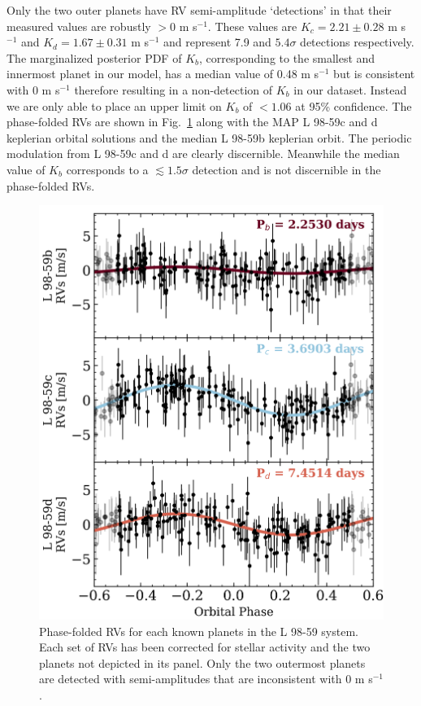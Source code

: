 \documentclass[longauth]{aa}
\newcommand{\mps}{m s$^{-1}$}
\begin{document}
Only the two outer planets have RV semi-amplitude `detections' in that their measured values are robustly $>0$ \mps{.} These values are $K_c=2.21\pm 0.28$ \mps{} and $K_d=1.67\pm 0.31$ \mps{} and represent 7.9 and $5.4\sigma$ detections respectively. The marginalized posterior PDF of $K_b$, corresponding to the smallest and innermost planet in our model, has a median value of 0.48 \mps{} but is consistent with 0 \mps{} therefore resulting in a non-detection of $K_b$ in our dataset. Instead we are only able to place an upper limit on $K_b$ of $<1.06$ at 95\% confidence. The phase-folded RVs are shown in Fig.~\ref{fig:rvphased} along with the MAP L 98-59c and d keplerian orbital solutions and the median L 98-59b keplerian orbit. The periodic modulation from L 98-59c and d are clearly discernible. Meanwhile the median value of $K_b$ corresponds to a $\lesssim 1.5\sigma$ detection and is not discernible in the phase-folded RVs.

\begin{figure}
    \centering
    \includegraphics[width=.96\hsize]{RVphased.png}
    \caption{Phase-folded RVs for each known planets in the L 98-59 system. Each set of RVs has been corrected for stellar activity and the two planets not depicted in its panel. Only the two outermost planets are detected with semi-amplitudes that are inconsistent with 0 \mps{.}}
    \label{fig:rvphased}
\end{figure}
\end{document}
